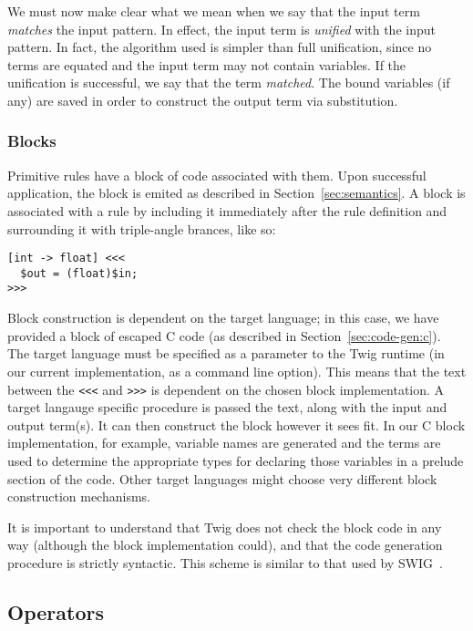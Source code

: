 We must now make clear what we mean when we say that the input term \emph{matches} the input pattern. In effect, the input term is \emph{unified}\cite{baader98rewriting} with the input pattern. In fact, the algorithm used is simpler than full unification, since no terms are equated and the input term may not contain variables. If the unification is successful, we say that the term \emph{matched}. The bound variables (if any) are saved in order to construct the output term via substitution.


\subsubsection{Blocks}

Primitive rules have a block of code associated with them. Upon successful application, the block is emited as described in Section~\ref{sec:semantics}. A block is associated with a rule by including it immediately after the rule definition and surrounding it with triple-angle brances, like so:

\begin{verbatim}
[int -> float] <<<
  $out = (float)$in;
>>>
\end{verbatim}

Block construction is dependent on the target language; in this case, we have provided a block of escaped C code (as described in Section~\ref{sec:code-gen:c}). The target language must be specified as a parameter to the Twig runtime (in our current implementation, as a command line option). This means that the text between the \texttt{<<<} and \texttt{>>>} is dependent on the chosen block implementation. A target langauge specific procedure is passed the text, along with the input and output term(s). It can then construct the block however it sees fit. In our C block implementation, for example, variable names are generated and the terms are used to determine the appropriate types for declaring those variables in a prelude section of the code. Other target languages might choose very different block construction mechanisms.

It is important to understand that Twig does not check the block code in any way (although the block implementation could), and that the code generation procedure is strictly syntactic. This scheme is similar to that used by SWIG~\cite{swig}.

\subsection{Operators}


